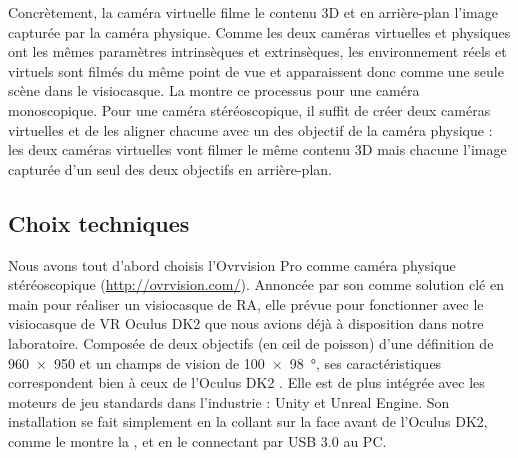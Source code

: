 Concrètement, la caméra virtuelle filme le contenu 3D et en arrière-plan l'image capturée par la caméra physique. Comme les deux caméras virtuelles et physiques ont les mêmes paramètres intrinsèques et extrinsèques, les environnement réels et virtuels sont filmés du même point de vue et apparaissent donc comme une seule scène dans le visiocasque. La  montre ce processus pour une caméra monoscopique. Pour une caméra stéréoscopique, il suffit de créer deux caméras virtuelles et de les aligner chacune avec un des objectif de la caméra physique : les deux caméras virtuelles vont filmer le même contenu 3D mais chacune l'image capturée d'un seul des deux objectifs en arrière-plan.



\subsection{Choix techniques}
\label{subsec:technical_choices}
Nous avons tout d'abord choisis l'Ovrvision Pro comme caméra physique stéréoscopique (\url{http://ovrvision.com/}). Annoncée par son comme solution clé en main pour réaliser un visiocasque de RA, elle prévue pour fonctionner avec le visiocasque de VR Oculus DK2 que nous avions déjà à disposition dans notre laboratoire. Composée de deux objectifs  (en \oe il de poisson) d'une définition de \SI{960x950}{\px} et un champs de vision de \SI{100x98}{\degree}, ses caractéristiques correspondent  bien à ceux de l'Oculus DK2 . Elle est de plus intégrée avec les moteurs de jeu standards dans l'industrie : Unity et Unreal Engine. Son installation se fait simplement en la collant sur la face avant de l'Oculus DK2, comme le montre la , et en le connectant par USB 3.0 au PC.

